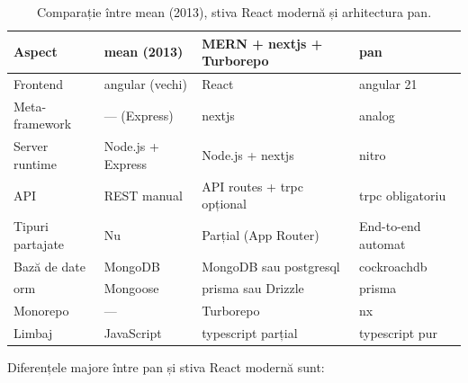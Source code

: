 \begin{table}[htbp]
\centering
\caption{Comparație între \gls{mean} (2013), stiva React modernă și arhitectura \gls{pan}.}
\label{tab:pan-vs-altele}
\small
\begin{tabularx}{\textwidth}{lYYY}
\toprule
\textbf{Aspect} & \textbf{\gls{mean} (2013)} & \textbf{MERN + \gls{nextjs} + Turborepo} & \textbf{\gls{pan}} \\
\midrule
Frontend         & \gls{angular} (vechi)   & React                  & \gls{angular} 21 \\
Meta-framework   & --- (Express)           & \gls{nextjs}           & \gls{analog} \\
Server runtime   & Node.js + Express       & Node.js + \gls{nextjs} & \gls{nitro} \\
API   & REST manual             & API routes + \gls{trpc} opțional & \gls{trpc} obligatoriu \\
Tipuri partajate & Nu                      & Parțial (App Router)   & End-to-end automat \\
Bază de date     & MongoDB                 & MongoDB sau \gls{postgresql} & \gls{cockroachdb} \\
\gls{orm}        & Mongoose                & \gls{prisma} sau Drizzle & \gls{prisma} \\
Monorepo         & ---                     & Turborepo              & \gls{nx} \\
Limbaj           & JavaScript              & \gls{typescript} parțial & \gls{typescript} pur \\
\bottomrule
\end{tabularx}
\end{table}

Diferențele majore între \gls{pan} și stiva React modernă sunt:

